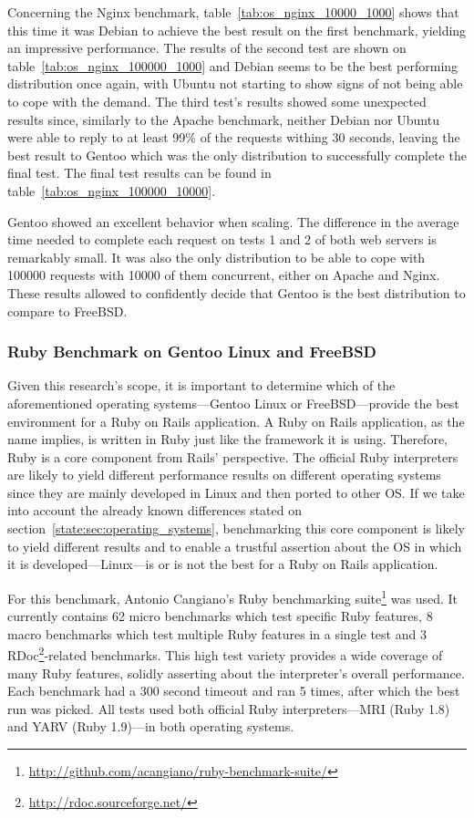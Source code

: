 Concerning the Nginx benchmark, table~\ref{tab:os_nginx_10000_1000} shows that this time it was Debian to achieve the best result on the first benchmark, yielding an impressive performance. The results of the second test are shown on table~\ref{tab:os_nginx_100000_1000} and Debian seems to be the best performing distribution once again, with Ubuntu not starting to show signs of not being able to cope with the demand. The third test's results showed some unexpected results since, similarly to the Apache benchmark, neither Debian nor Ubuntu were able to reply to at least 99\% of the requests withing 30 seconds, leaving the best result to Gentoo which was the only distribution to successfully complete the final test. The final test results can be found in table~\ref{tab:os_nginx_100000_10000}.

Gentoo showed an excellent behavior when scaling. The difference in the average time needed to complete each request on tests 1 and 2 of both web servers is remarkably small. It was also the only distribution to be able to cope with 100000 requests with 10000 of them concurrent, either on Apache and Nginx. These results allowed to confidently decide that Gentoo is the best distribution to compare to FreeBSD.

\subsubsection{Ruby Benchmark on Gentoo Linux and FreeBSD}
Given this research's scope, it is important to determine which of the aforementioned operating systems---Gentoo Linux or FreeBSD---provide the best environment for a Ruby on Rails application. A Ruby on Rails application, as the name implies, is written in Ruby just like the framework it is using. Therefore, Ruby is a core component from Rails' perspective. The official Ruby interpreters are likely to yield different performance results on different operating systems since they are mainly developed in Linux and then ported to other OS. If we take into account the already known differences stated on section~\ref{state:sec:operating_systems}, benchmarking this core component is likely to yield different results and to enable a trustful assertion about the OS in which it is developed---Linux---is or is not the best for a Ruby on Rails application.

For this benchmark, Antonio Cangiano's Ruby benchmarking suite\footnote{\url{http://github.com/acangiano/ruby-benchmark-suite/}} was used. It currently contains 62 micro benchmarks which test specific Ruby features, 8 macro benchmarks which test multiple Ruby features in a single test and 3 RDoc\footnote{\url{http://rdoc.sourceforge.net/}}-related benchmarks. This high test variety provides a wide coverage of many Ruby features, solidly asserting about the interpreter's overall performance. Each benchmark had a 300 second timeout and ran 5 times, after which the best run was picked. All tests used both official Ruby interpreters---MRI (Ruby 1.8) and YARV (Ruby 1.9)---in both operating systems.

